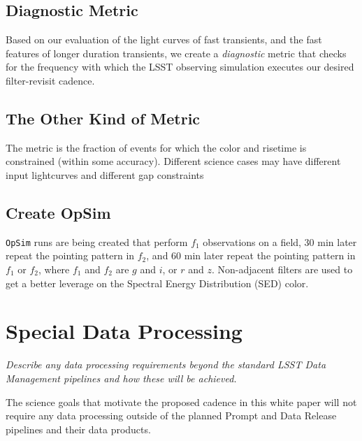 \documentclass[11pt]{article}
\begin{document}
\subsection{Diagnostic Metric}

Based on our evaluation of the light curves of fast transients, and the fast features of longer duration transients, we create a {\it diagnostic} metric that checks for the frequency with which the LSST observing simulation executes our desired filter-revisit cadence. 

\subsection{The Other Kind of Metric}

The metric is the fraction of events for which the color and risetime is constrained (within some accuracy). Different science cases may have different input lightcurves and different gap constraints


\subsection{Create OpSim}

{\tt OpSim} runs are being created that perform $f_1$ observations on a field, 30 min later repeat the pointing pattern in $f_2$, and 60 min later repeat the pointing pattern in $f_1$ or $f_2$, where $f_1$ and $f_2$ are $g$ and $i$, or $r$ and $z$. Non-adjacent filters are used to get a better leverage on the Spectral Energy Distribution (SED) color.

\vspace{.6in}

\clearpage
\section{Special Data Processing}
\begin{footnotesize}
{\it Describe any data processing requirements beyond the standard LSST Data Management pipelines and how these will be achieved.}
\end{footnotesize}

The science goals that motivate the proposed cadence in this white paper will not require any data processing outside of the planned Prompt and Data Release pipelines and their data products. 




\end{document}
